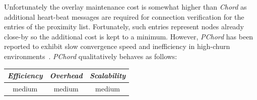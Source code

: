 Unfortunately the overlay maintenance cost is somewhat higher than
\emph{Chord} as additional heart-beat messages are required for
connection verification for the entries of the proximity list. 
Fortunately, such entries represent nodes 
already close-by so the additional cost is kept to a minimum.
However, \emph{PChord} has been reported to exhibit slow convergence speed 
and inefficiency in high-churn environments~\cite{DK2006}.
\emph{PChord} qualitatively behaves as follows:
\begin{center}
{\footnotesize
\begin{tabular}{ccc}
\emph{Efficiency} & \emph{Overhead} & \emph{Scalability} \\
\hline
medium &
medium &
medium
\end{tabular}
}
\end{center}

